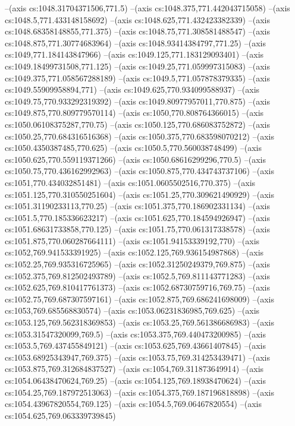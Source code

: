 --(axis cs:1048.31704371506,771.5)
--(axis cs:1048.375,771.442043715058)
--(axis cs:1048.5,771.433148158692)
--(axis cs:1048.625,771.432423382339)
--(axis cs:1048.68358148855,771.375)
--(axis cs:1048.75,771.308581488547)
--(axis cs:1048.875,771.30774683964)
--(axis cs:1048.93414384797,771.25)
--(axis cs:1049,771.184143847966)
--(axis cs:1049.125,771.183129093401)
--(axis cs:1049.18499731508,771.125)
--(axis cs:1049.25,771.059997315083)
--(axis cs:1049.375,771.058567288189)
--(axis cs:1049.5,771.057878379335)
--(axis cs:1049.55909958894,771)
--(axis cs:1049.625,770.934099588937)
--(axis cs:1049.75,770.933292319392)
--(axis cs:1049.80977957011,770.875)
--(axis cs:1049.875,770.809779570114)
--(axis cs:1050,770.808764366015)
--(axis cs:1050.06108375287,770.75)
--(axis cs:1050.125,770.686083752872)
--(axis cs:1050.25,770.684316516368)
--(axis cs:1050.375,770.683598070212)
--(axis cs:1050.4350387485,770.625)
--(axis cs:1050.5,770.560038748499)
--(axis cs:1050.625,770.559119371266)
--(axis cs:1050.68616299296,770.5)
--(axis cs:1050.75,770.436162992963)
--(axis cs:1050.875,770.434743737106)
--(axis cs:1051,770.434032851481)
--(axis cs:1051.0605502516,770.375)
--(axis cs:1051.125,770.310550251604)
--(axis cs:1051.25,770.309621490929)
--(axis cs:1051.31190233113,770.25)
--(axis cs:1051.375,770.186902331134)
--(axis cs:1051.5,770.185336623217)
--(axis cs:1051.625,770.184594926947)
--(axis cs:1051.68631733858,770.125)
--(axis cs:1051.75,770.061317338578)
--(axis cs:1051.875,770.060287664111)
--(axis cs:1051.94153339192,770)
--(axis cs:1052,769.941533391925)
--(axis cs:1052.125,769.936154987868)
--(axis cs:1052.25,769.935316725965)
--(axis cs:1052.31250249379,769.875)
--(axis cs:1052.375,769.812502493789)
--(axis cs:1052.5,769.811143771283)
--(axis cs:1052.625,769.810417761373)
--(axis cs:1052.68730759716,769.75)
--(axis cs:1052.75,769.687307597161)
--(axis cs:1052.875,769.686241698009)
--(axis cs:1053,769.685568830574)
--(axis cs:1053.06231836985,769.625)
--(axis cs:1053.125,769.562318369853)
--(axis cs:1053.25,769.561386686983)
--(axis cs:1053.31547320099,769.5)
--(axis cs:1053.375,769.440473200985)
--(axis cs:1053.5,769.437455849121)
--(axis cs:1053.625,769.43661407845)
--(axis cs:1053.68925343947,769.375)
--(axis cs:1053.75,769.314253439471)
--(axis cs:1053.875,769.312684837527)
--(axis cs:1054,769.311873649914)
--(axis cs:1054.06438470624,769.25)
--(axis cs:1054.125,769.18938470624)
--(axis cs:1054.25,769.187972513063)
--(axis cs:1054.375,769.187196818898)
--(axis cs:1054.43967820554,769.125)
--(axis cs:1054.5,769.06467820554)
--(axis cs:1054.625,769.063339739845)
